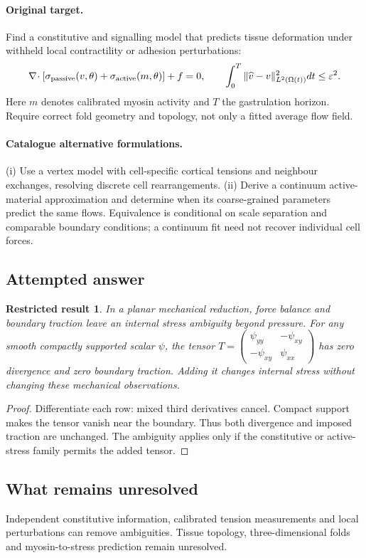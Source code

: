 \documentclass[11pt]{article}
\newtheorem{attemptresult}{Restricted result}[section]
\begin{document}
\paragraph{Original target.}
Find a constitutive and signalling model that predicts tissue deformation under withheld local contractility or adhesion perturbations:
\[
\nabla\!\cdot[\sigma_{\rm passive}(v,\theta)+\sigma_{\rm active}(m,\theta)]+f=0,
\qquad
\int_0^T\|\widehat v-v\|_{L^2(\Omega(t))}^2dt\leq\varepsilon^2.
\]
Here $m$ denotes calibrated myosin activity and $T$ the gastrulation horizon. Require correct fold geometry and topology, not only a fitted average flow field.
\paragraph{Catalogue alternative formulations.}
(i) Use a vertex model with cell-specific cortical tensions and neighbour exchanges, resolving discrete cell rearrangements. (ii) Derive a continuum active-material approximation and determine when its coarse-grained parameters predict the same flows. Equivalence is conditional on scale separation and comparable boundary conditions; a continuum fit need not recover individual cell forces.
\subsection{Attempted answer}
\begin{attemptresult}
In a planar mechanical reduction, force balance and boundary traction leave an internal stress ambiguity beyond pressure. For any smooth compactly supported scalar $\psi$, the tensor $T=\left(\begin{smallmatrix}\psi_{yy}&-\psi_{xy}\\-\psi_{xy}&\psi_{xx}\end{smallmatrix}\right)$ has zero divergence and zero boundary traction. Adding it changes internal stress without changing these mechanical observations.
\end{attemptresult}
\begin{proof}
Differentiate each row: mixed third derivatives cancel. Compact support makes the tensor vanish near the boundary. Thus both divergence and imposed traction are unchanged. The ambiguity applies only if the constitutive or active-stress family permits the added tensor.
\end{proof}
\subsection{What remains unresolved}
Independent constitutive information, calibrated tension measurements and local perturbations can remove ambiguities. Tissue topology, three-dimensional folds and myosin-to-stress prediction remain unresolved.
\end{document}
